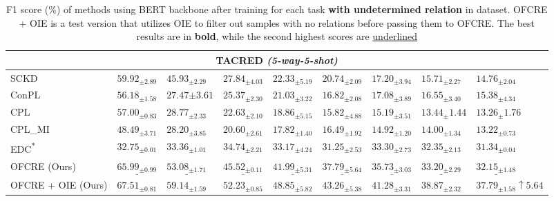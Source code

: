 \begin{table*}[ht]
\begin{adjustbox}{width=\textwidth}
\begin{tabular}{lllllllll}
\toprule
\multicolumn{9}{c}{\textbf{TACRED} \textit{(5-way-5-shot)}} \\
\midrule
SCKD       & {$59.92_{\pm 2.89}$} & $45.93_{\pm 2.29}$ & $27.84_{\pm 4.03}$ & $22.33_{\pm 5.19}$ & $20.74_{\pm 2.09}$ & $17.20_{\pm 3.94}$ & $15.71_{\pm 2.27}$ & $14.76_{\pm 2.04}$ \\
ConPL & {${56.18_{\pm 1.58}}$} & $27.47{\pm 3.61}$ & $25.37_{\pm 2.30}$ & $21.03_{\pm 3.22}$ & $16.82_{\pm 2.08}$ & $17.08_{\pm 3.89}$ & $16.55_{\pm 3.40}$ & $15.38_{\pm 4.34}$ \\ 
CPL & {$57.00_{\pm 0.83}$} & $28.77_{\pm 2.33}$ & $22.63_{\pm 2.10}$ & $18.86_{\pm 5.15}$ & $15.82_{\pm 4.88}$ & $15.19_{\pm 3.51}$ & $13.44_{\pm }1.44$ & $13.26_{\pm }1.76$ \\ 
CPL\_MI & $48.49_{\pm 3.71}$ & {$28.20_{\pm 3.85}$} & {$20.60_{\pm 2.61}$} & {$17.82_{\pm 1.40}$} & {$16.49_{\pm 1.92}$} & {$14.92_{\pm 1.20}$} & {$14.00_{\pm 1.34}$} & {$13.22_{\pm 0.73}$} \\
EDC\textsuperscript{*} & $32.75_{\pm 0.01}$ & {$33.36_{\pm 1.01}$} & {$34.74_{\pm 2.21}$} & {$33.17_{\pm 4.24}$} & {$31.25_{\pm 2.53}$} & {$33.30_{\pm 2.73}$} & {$32.35_{\pm 2.13}$} & {$31.34_{\pm 0.04}$} \\

OFCRE (Ours)& $\underline{65.99_{\pm 0.99}}$ & $\underline{53.08_{\pm 1.71}}$ & $\underline{45.52_{\pm 0.11}}$ & $\underline{41.99_{\pm 5.31}}$ & $\underline{37.79_{\pm 5.64}}$ & $\underline{35.73_{\pm 3.03}}$ & $\underline{33.20_{\pm 2.29}}$ & $\underline{32.15_{\pm 1.48}}$ \\
OFCRE + OIE (Ours)& $\mathbf{67.51_{\pm 0.81}}$ & $\mathbf{59.14_{\pm 1.59}}$ & $\mathbf{52.23_{\pm 0.85}}$ & $\mathbf{48.85_{\pm 5.82}}$ & $\mathbf{43.26_{\pm 5.38}}$ & $\mathbf{41.28_{\pm 3.31}}$ & $\mathbf{38.87_{\pm 2.32}}$ & $\mathbf{37.79_{\pm 1.58}}${\color{darkgreen}\footnotesize  $\uparrow{5.64}$} \\
\toprule
\end{tabular}
\end{adjustbox}
\caption{F1 score (\%) of methods using BERT backbone after training for each task \textbf{with undetermined relation} in dataset. OFCRE + OIE is a test version that utilizes OIE to filter out samples with no relations before passing them to OFCRE. The best results are in \textbf{bold}, while the second highest scores are \underline{underlined}}
\label{table:main_ur}
\end{table*}



